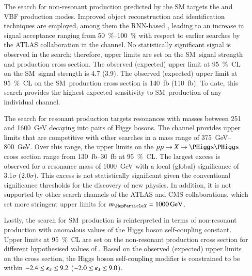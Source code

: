 The search for non-resonant \HH production predicted by the SM targets the \ggF
and VBF production modes. Improved object reconstruction and identification
techniques are employed, among them the RNN-based \tauid, leading to an increase
in signal acceptance ranging from \SIrange{50}{100}{\percent} with respect to
earlier searches by the ATLAS collaboration in the \bbtautau channel. No
statistically significant signal is observed in the search; therefore, upper
limits are set on the SM~\HH signal strength and production cross section. The
observed (expected) upper limit at \SI{95}{\percent}~CL on the SM~\HH signal
strength is 4.7 (3.9).  The observed (expected) upper limit at
\SI{95}{\percent}~CL on the SM~\HH production cross section is
\SI{140}{\femto\barn} (\SI{110}{\femto\barn}). To date, this search provides the
highest expected sensitivity to SM~\HH production of any individual channel.


The search for resonant \HH production targets resonances with masses between
\num{251} and \SI{1600}{\GeV} decaying into pairs of Higgs bosons. The \bbtautau
channel provides upper limits that are competitive with other searches in a mass
range of \SIrange{375}{800}{\GeV}. Over this range, the upper limits on the
$pp \to X \to \HH$ cross section range from \SIrange{130}{30}{\femto\barn} at
\SI{95}{\percent}~CL. The largest excess is observed for a resonance mass of
\SI{1000}{\GeV} with a local (global) significance of $3.1\sigma$
($2.0\sigma$). This excess is not statistically significant given the
conventional significance thresholds for the discovery of new physics. In
addition, it is not supported by other search channels of the ATLAS and CMS
collaborations, which set more stringent upper limits for
$\mX = \SI{1000}{\GeV}$.


Lastly, the search for SM~\HH production is reinterpreted in terms of
non-resonant \HH production with anomalous values of the Higgs boson
self-coupling constant. Upper limits at \SI{95}{\percent}~CL are set on the
non-resonant \HH production cross section for different hypothesised values of
\klambda. Based on the observed (expected) upper limits on the cross section,
the Higgs boson self-coupling modifier is constrained to be within
$-2.4 \leq \kappa_{\lambda} \leq 9.2$ ($-2.0 \leq \kappa_{\lambda} \leq 9.0$).


